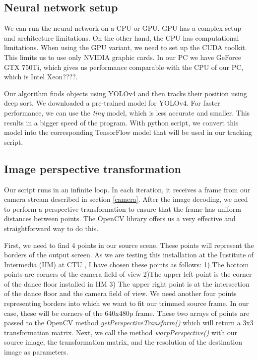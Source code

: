 \documentclass{ctuthesis}
\begin{document}
\subsection{Neural network setup}
We can run the neural network on a CPU or GPU. GPU has a complex setup and architecture limitations. On the other hand, the CPU has computational limitations. When using the GPU variant, we need to set up the CUDA toolkit. This limits us to use only NVIDIA graphic cards. In our PC we have GeForce GTX 750Ti, which gives us performance comparable with the CPU of our PC, which is Intel Xeon????. 

Our algorithm finds objects using YOLOv4 and then tracks their position using deep sort. We downloaded a pre-trained model for YOLOv4\cite{96}. For faster performance, we can use the \textit{tiny} model, which is less accurate and smaller. This results in a bigger speed of the program. With python script, we convert this model into the corresponding TensorFlow model that will be used in our tracking script.

\subsection{Image perspective transformation} \label{transform}
Our script runs in an infinite loop. In each iteration, it receives a frame from our camera stream described in section \ref{camera}. After the image decoding, we need to perform a perspective transformation to ensure that the frame has uniform distances between points. The OpenCV library offers us a very effective and straightforward way to do this. 

First, we need to find 4 points in our source scene. These points will represent the borders of the output screen. As we are testing this installation at the Institute of Intermedia (IIM) at CTU \cite{95}, I have chosen these points as follows: 1) The bottom points are corners of the camera field of view 2)The upper left point is the corner of the dance floor installed in IIM 3) The upper right point is at the intersection of the dance floor and the camera field of view. We need another four points representing borders into which we want to fit our trimmed source frame. In our case, these will be corners of the 640x480p frame. These two arrays of points are passed to the OpenCV method \textit{getPerspectiveTransform()} which will return a 3x3 transformation matrix. Next, we call the method \textit{warpPerspective()} with our source image, the transformation matrix, and the resolution of the destination image as parameters. 
\end{document}
